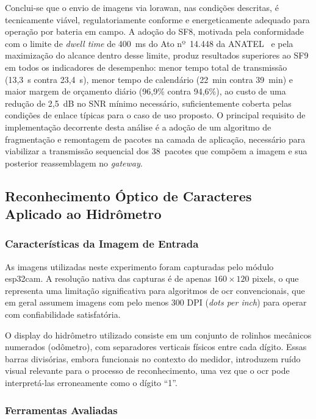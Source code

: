 Conclui-se que o envio de imagens via \gls{lorawan}, nas condições descritas, é 
tecnicamente viável, regulatoriamente conforme e energeticamente adequado
para operação por bateria em campo. A adoção do SF8, motivada pela conformidade
com o limite de \textit{dwell time} de 400~ms do Ato nº~14.448 da
ANATEL~\cite{anatel2017} e pela maximização do alcance dentro desse limite, produz
resultados superiores ao SF9 em todos os indicadores de desempenho: menor tempo
total de transmissão (13,3~s contra 23,4~s), menor tempo de calendário (22~min contra
39~min) e maior margem de orçamento diário (96,9\% contra 94,6\%), ao custo de uma
redução de 2,5~dB no SNR mínimo necessário, suficientemente coberta pelas condições
de enlace típicas para o caso de uso proposto. O principal requisito de implementação
decorrente desta análise é a adoção de um algoritmo de fragmentação e remontagem de
pacotes na camada de aplicação, necessário para viabilizar a transmissão sequencial
dos 38~pacotes que compõem a imagem e sua posterior reassemblagem no
\textit{gateway}.

\subsection{Reconhecimento Óptico de Caracteres Aplicado ao Hidrômetro}

\subsubsection{Características da Imagem de Entrada}

As imagens utilizadas neste experimento foram capturadas pelo módulo \gls{esp32cam}. A resolução nativa das capturas é de apenas $160 \times 120$ pixels, o que representa uma limitação significativa para algoritmos de \gls{ocr} convencionais, que em geral assumem imagens com pelo menos 300 DPI (\textit{dots per inch}) para operar com confiabilidade satisfatória.

O display do hidrômetro utilizado consiste em um conjunto de rolinhos mecânicos numerados (odômetro), com separadores verticais físicos entre cada dígito. Essas barras divisórias, embora funcionais no contexto do medidor, introduzem ruído visual relevante para o processo de reconhecimento, uma vez que o \gls{ocr} pode interpretá-las erroneamente como o dígito ``1''.

\subsubsection{Ferramentas Avaliadas}

